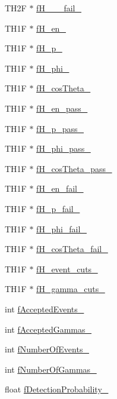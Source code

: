 \begin{DoxyCompactItemize}
\item 
T\+H2F $\ast$ \hyperlink{classPsDecay_a929f173b06a0cee44ea090f5d35d15c8}{f\+H\+\_\+\_\+\_\+fail\+\_\+}
\item 
T\+H1F $\ast$ \hyperlink{classPsDecay_a6dfa432418e7f7e49ee6635e4df80c70}{f\+H\+\_\+en\+\_\+}
\item 
T\+H1F $\ast$ \hyperlink{classPsDecay_a7dc7f2407d80e5439a397632723ed60d}{f\+H\+\_\+p\+\_\+}
\item 
T\+H1F $\ast$ \hyperlink{classPsDecay_ae501ea764ce924148fca7d6b1690c40b}{f\+H\+\_\+phi\+\_\+}
\item 
T\+H1F $\ast$ \hyperlink{classPsDecay_ac3abee8f113229cc7fc3b5c6822b08c9}{f\+H\+\_\+cos\+Theta\+\_\+}
\item 
T\+H1F $\ast$ \hyperlink{classPsDecay_a3d42050216fe2a6d43d63fd0a0a6e94a}{f\+H\+\_\+en\+\_\+pass\+\_\+}
\item 
T\+H1F $\ast$ \hyperlink{classPsDecay_a65d304f41e588f9588cb551826989dae}{f\+H\+\_\+p\+\_\+pass\+\_\+}
\item 
T\+H1F $\ast$ \hyperlink{classPsDecay_a8f1c6d7069dad26f9fab9e319e940db2}{f\+H\+\_\+phi\+\_\+pass\+\_\+}
\item 
T\+H1F $\ast$ \hyperlink{classPsDecay_aa35962b605f27e790af869e62b8e30b0}{f\+H\+\_\+cos\+Theta\+\_\+pass\+\_\+}
\item 
T\+H1F $\ast$ \hyperlink{classPsDecay_ad545f241da3ae36ce43bc082a0c71183}{f\+H\+\_\+en\+\_\+fail\+\_\+}
\item 
T\+H1F $\ast$ \hyperlink{classPsDecay_a6e4560ff2d8b93cb0654535579fef5cf}{f\+H\+\_\+p\+\_\+fail\+\_\+}
\item 
T\+H1F $\ast$ \hyperlink{classPsDecay_abb74a986a7f2115c0113b2a0702b7e80}{f\+H\+\_\+phi\+\_\+fail\+\_\+}
\item 
T\+H1F $\ast$ \hyperlink{classPsDecay_a08392542526dfd2f80ed110843b477a4}{f\+H\+\_\+cos\+Theta\+\_\+fail\+\_\+}
\item 
T\+H1F $\ast$ \hyperlink{classPsDecay_adedcdf6c1878a93c5f2c3809f6ced052}{f\+H\+\_\+event\+\_\+cuts\+\_\+}
\item 
T\+H1F $\ast$ \hyperlink{classPsDecay_aaa94c7a338ede5d9b6cfbdd5a6a72d4e}{f\+H\+\_\+gamma\+\_\+cuts\+\_\+}
\item 
int \hyperlink{classPsDecay_a7dd049a762031e8b8120db993f430603}{f\+Accepted\+Events\+\_\+}
\item 
int \hyperlink{classPsDecay_a0edd6a352178070e2433bee0a0632264}{f\+Accepted\+Gammas\+\_\+}
\item 
int \hyperlink{classPsDecay_a32e3f4712d0c7a995d0b8c959c720e79}{f\+Number\+Of\+Events\+\_\+}
\item 
int \hyperlink{classPsDecay_a7181fb08b4524a9f222bb5178e2b33b4}{f\+Number\+Of\+Gammas\+\_\+}
\item 
float \hyperlink{classPsDecay_afcd2742fdf65e1f1070294b06fc112c7}{f\+Detection\+Probability\+\_\+}
\end{DoxyCompactItemize}


